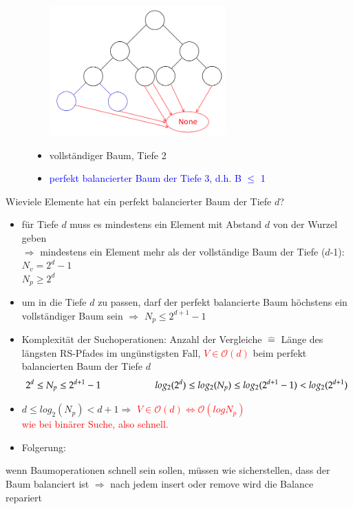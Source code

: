 \documentclass[11pt, fleqn]{scrreprt}
\begin{document}
\begin{figure}[htbp]
	\begin{minipage}[t]{8cm}
		\vspace{0pt}
		\centering
		\includegraphics[width=8cm,height=5cm,keepaspectratio]{./Pictures/BalanBaum.png}
	\end{minipage}
	\begin{minipage}[t]{6cm}
		\vspace{1cm}
		\begin{itemize}
			\item vollständiger Baum, Tiefe 2
			\item \textcolor{blue}{perfekt balancierter Baum der Tiefe 3, d.h. B $\leq$ 1}
		\end{itemize}
	\end{minipage}
\end{figure}

Wieviele Elemente hat ein perfekt balancierter Baum der Tiefe $d$?
\begin{itemize}
	\item für Tiefe $d$ muss es mindestens ein Element mit Abstand $d$ von der Wurzel geben \\
	$\Rightarrow$ mindestens ein Element mehr als der vollständige Baum der Tiefe ($d$-1): $N_v = 2^d -1$\\
	$N_p \geq 2^d$
	\item um in die Tiefe $d$ zu passen, darf der perfekt balancierte Baum höchstens ein vollständiger Baum sein $\Rightarrow$ $N_p \leq 2^{d+1} -1$
\end{itemize}
\begin{itemize}[label={$\Rightarrow$}]
	\item Komplexität der Suchoperationen: Anzahl der Vergleiche $\widehat{=}$ Länge des längsten RS-Pfades im ungünstigsten Fall, \textcolor{red}{$V \in \mathcal{O}(d)$} beim perfekt balancierten Baum der Tiefe $d$ \\
	\[ 2^d \leq N_p \leq 2^{d+1} - 1 \hspace*{2cm} log_2(2^d) \leq log_2(N_p) \leq log_2(2^{d+1}-1) < log_2(2^{d+1})\]
	\item $d\leq log_2(N_p) < d + 1 \Rightarrow$ \textcolor{red}{$V \in \mathcal{O}(d) \Leftrightarrow \mathcal{O}(log N_p)$}\\
	\textcolor{red}{wie bei binärer Suche, also schnell.}
	\item Folgerung: 
\end{itemize}wenn Baumoperationen schnell sein sollen, müssen wie sicherstellen, dass der Baum balanciert ist $\Rightarrow$ nach jedem insert oder remove wird die Balance \glqq repariert\grqq
\end{document}
